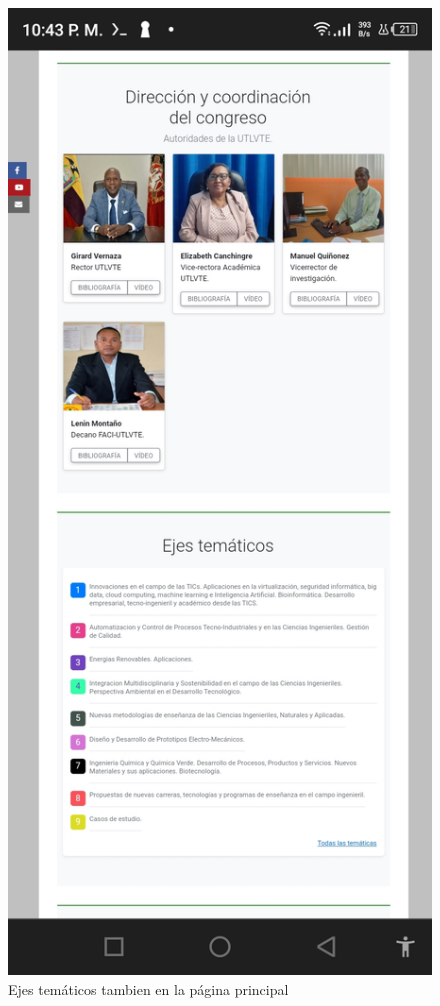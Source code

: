 \documentclass[a4paper,14px]{article}
\begin{document}
\hspace{0.5cm}
\begin{minipage}[H]{0.5\linewidth}
  \begin{figure}[H]
    \centering
    \includegraphics[scale=0.3]{index2.jpg}
    \caption{Ejes temáticos tambien en la página principal}
    \label{fig:tematicas2}
  \end{figure}
\end{minipage}
\end{document}
